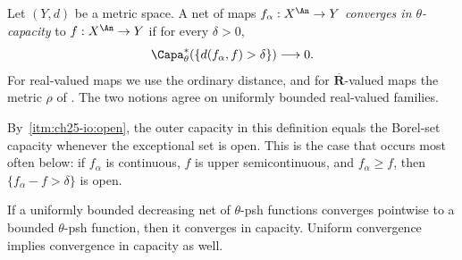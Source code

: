 \begin{definition}
\label{def:ch25-convergence-in-capacity}
Let $(Y,d)$ be a metric space.  A net of maps
$f_\alpha:X^{\An}\to Y$ \emph{converges in $\theta$-capacity} to
$f:X^{\An}\to Y$ if for every $\delta>0$,
\[
             \Capa^*_\theta(\{d(f_\alpha,f)>\delta\})\longrightarrow0.
\]
For real-valued maps we use the ordinary distance, and for
$\overline{\mathbf R}$-valued maps the metric $\rho$ of
.  The two notions agree on uniformly bounded
real-valued families.
\end{definition}

By \,\cref{itm:ch25-io:open}, the outer capacity
in this definition equals the Borel-set capacity whenever the exceptional
set is open.  This is the case that occurs most often below: if $f_\alpha$ is
continuous, $f$ is upper semicontinuous, and $f_\alpha\geq f$, then
$\{f_\alpha-f>\delta\}$ is open.

\begin{proposition}
\label{prop:decreasing-capacity-convergence}
If a uniformly bounded decreasing net of $\theta$-psh functions converges
pointwise to a bounded $\theta$-psh function, then it converges in
capacity. Uniform convergence implies convergence in capacity as well.
\end{proposition}

